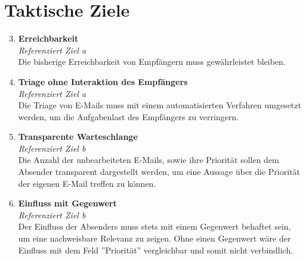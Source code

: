 \section{Taktische Ziele}
\begin{enumerate}[label=(\alph*)]
\setcounter{enumi}{2}
    \item \textbf{Erreichbarkeit}\\
    \textit{Referenziert Ziel a} \\
        Die bisherige Erreichbarkeit von Empfängern muss gewährleistet bleiben.
        
    \item \textbf{Triage ohne Interaktion des Empfängers}\\
    \textit{Referenziert Ziel a} \\
        Die Triage von E-Mails muss mit einem automatisierten Verfahren umgesetzt werden, um die Aufgabenlast des Empfängers zu verringern.
        
    \item \textbf{Transparente Warteschlange}\\
    \textit{Referenziert Ziel b} \\
        Die Anzahl der unbearbeiteten E-Mails, sowie ihre Priorität sollen dem Absender transparent dargestellt werden, um eine Aussage über die Priorität der eigenen E-Mail treffen zu können.
    
    \item \textbf{Einfluss mit Gegenwert}\\
    \textit{Referenziert Ziel b} \\
        Der Einfluss der Absenders muss stets mit einem Gegenwert behaftet sein, um eine nachweisbare Relevanz zu zeigen. Ohne einen Gegenwert wäre der Einfluss mit dem Feld ''Priorität'' vergleichbar und somit nicht verbindlich.
\end{enumerate}


